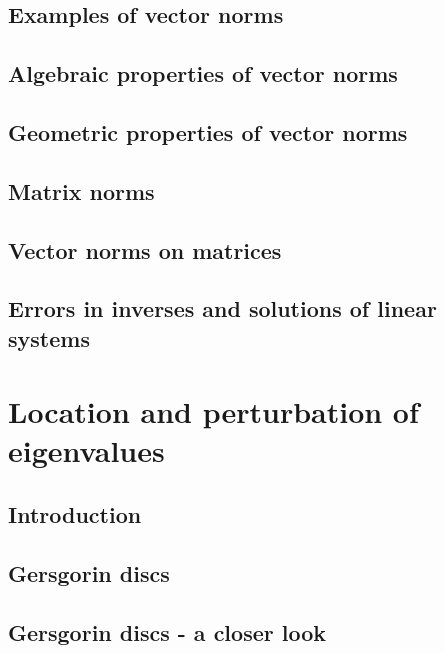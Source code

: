 \documentclass[a4paper]{article}
\newcommand{\todobox}{\textcolor{red}{\fbox{\phantom{--}}}}
\begin{document}
\subsection{Examples of vector norms}
\todobox
\subsection{Algebraic properties of vector norms}
\todobox
\subsection{Geometric properties of vector norms}
\todobox
\subsection{Matrix norms}
\todobox
\subsection{Vector norms on matrices}
\todobox
\subsection{Errors in inverses and solutions of linear systems}
\todobox

\newpage
\section{Location and perturbation of eigenvalues}
\setcounter{subsection}{-1}
\subsection{Introduction}
\todobox
\subsection{Gersgorin discs}
\todobox
\subsection{Gersgorin discs - a closer look}
\todobox
\end{document}
